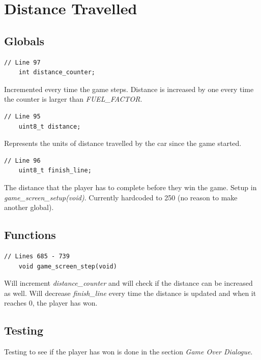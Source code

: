 \documentclass{article}
\begin{document}
\clearpage

\section{Distance Travelled}
\subsection*{Globals}
\begin{lstlisting}[style=CStyle]
	// Line 97
	int distance_counter;
\end{lstlisting}
Incremented every time the game steps. Distance is increased by one every time the counter is larger than \emph{FUEL\_FACTOR}.
\begin{lstlisting}[style=CStyle]
	// Line 95
	uint8_t distance;
\end{lstlisting}
Represents the units of distance travelled by the car since the game started. 
\begin{lstlisting}[style=CStyle]
	// Line 96
	uint8_t finish_line;
\end{lstlisting}
The distance that the player has to complete before they win the game. Setup in \emph{game\_screen\_setup(void)}. Currently hardcoded to 250 (no reason to make another global).
\newline

\subsection*{Functions}
\begin{lstlisting}[style=CStyle]
	// Lines 685 - 739
	void game_screen_step(void)
\end{lstlisting}
Will increment \emph{distance\_counter} and will check if the distance can be increased as well. Will decrease \emph{finish\_line} every time the distance is updated and when it reaches 0, the player has won.
\newline

\subsection*{Testing}
Testing to see if the player has won is done in the section \emph{Game Over Dialogue}. 
\end{document}
